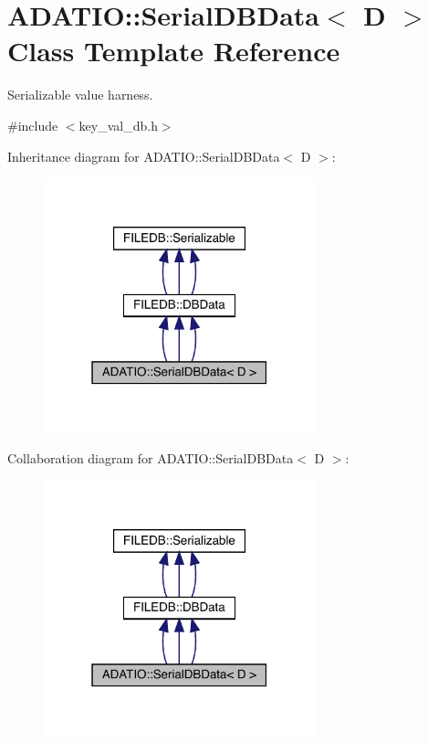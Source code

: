 \hypertarget{classADATIO_1_1SerialDBData}{}\section{A\+D\+A\+T\+IO\+:\+:Serial\+D\+B\+Data$<$ D $>$ Class Template Reference}
\label{classADATIO_1_1SerialDBData}


Serializable value harness.  




{\ttfamily \#include $<$key\+\_\+val\+\_\+db.\+h$>$}



Inheritance diagram for A\+D\+A\+T\+IO\+:\+:Serial\+D\+B\+Data$<$ D $>$\+:
\nopagebreak
\begin{figure}[H]
\begin{center}
\leavevmode
\includegraphics[width=223pt]{d1/dc6/classADATIO_1_1SerialDBData__inherit__graph}
\end{center}
\end{figure}


Collaboration diagram for A\+D\+A\+T\+IO\+:\+:Serial\+D\+B\+Data$<$ D $>$\+:
\nopagebreak
\begin{figure}[H]
\begin{center}
\leavevmode
\includegraphics[width=223pt]{db/d16/classADATIO_1_1SerialDBData__coll__graph}
\end{center}
\end{figure}
